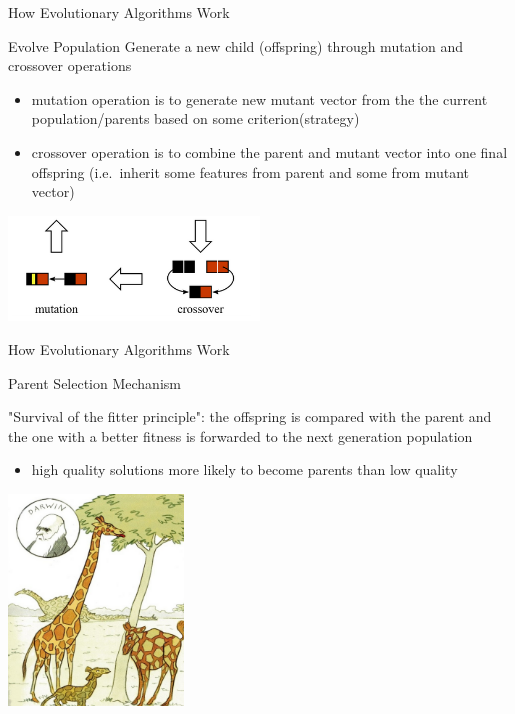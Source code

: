 \begin{frame}{How Evolutionary Algorithms Work}
\begin{block}{Evolve Population}
Generate a new child (offspring) through mutation and crossover operations
\begin{itemize}
    \item mutation operation is to generate new mutant vector from the the current population/parents based on some criterion(strategy)   
    \item crossover operation is to combine the parent and mutant vector into one final offspring (i.e.\ inherit some features from parent and some from mutant vector)  
\end{itemize}
\end{block}
\centering
\includegraphics[width=0.5\textwidth]{new_images/pop00.png}
\end{frame}

\begin{frame}{How Evolutionary Algorithms Work}
\begin{block}{Parent Selection Mechanism}

"Survival of the fitter principle": the offspring is compared with the parent and the one with a better fitness is forwarded to the next generation population
\begin{itemize}
    \item high quality solutions more likely to become parents than low quality
\end{itemize}
\end{block}
\centering
\includegraphics[width=0.35\textwidth]{new_images/selec00.png} 

\end{frame}

